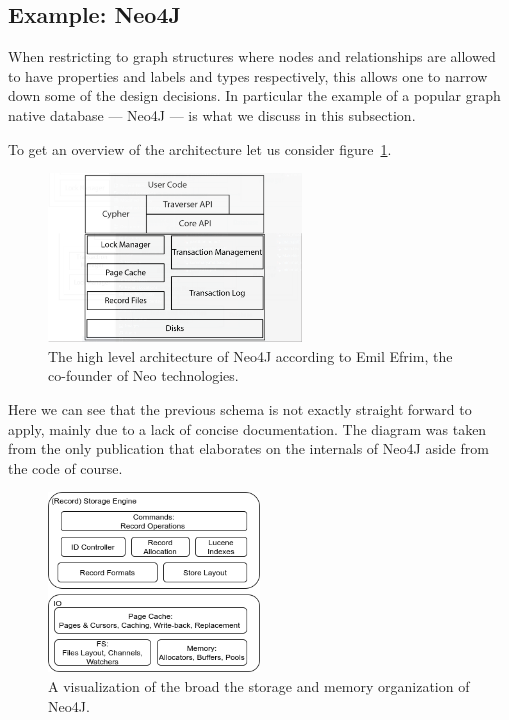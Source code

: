     \subsection{Example: Neo4J}\label{\positionnumber}
        When restricting to graph structures where nodes and relationships are allowed to have properties and labels and types respectively, this allows one to narrow down some of the design decisions.
        In particular the example of a popular graph native database --- Neo4J --- is what we discuss in this subsection.

        To get an overview of the architecture let us consider figure~\ref{N4J_HLA_Emil}. 

        \begin{figure}[htp]\label{N4J_HLA_Emil}
        \begin{center}
        \includegraphics[keepaspectratio,width=0.6\textwidth]{img/00_intro/N4J_HLA_Emil.png}
        \end{center}
        \caption{The high level architecture of Neo4J according to Emil Efrim, the co-founder of Neo technologies.} %
        \end{figure}

        Here we can see that the previous schema is not exactly straight forward to apply, mainly due to a lack of concise documentation.
        The diagram was taken from the only publication that elaborates on the internals of Neo4J aside from the code of course.
        
        \begin{figure}[htp]\label{N4J_Storage}
        \begin{center}
        \includegraphics[keepaspectratio,width=0.5\textwidth,height=0.3\textheight]{img/00_intro/N4J_Storage.png}
        \end{center}
        \caption{A visualization of the broad the storage and memory organization of Neo4J.} %
        \end{figure}
        
